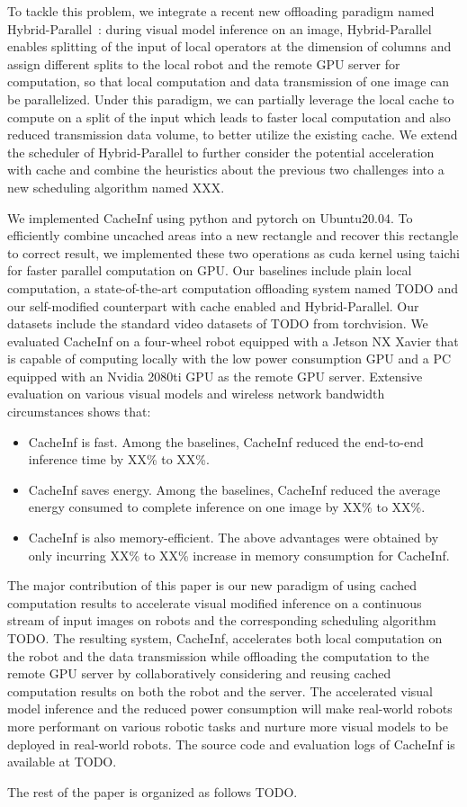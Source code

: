 To tackle this problem, we integrate a recent new offloading paradigm named Hybrid-Parallel~\cite{sun2024hybridparallel}: during visual model inference on an image, Hybrid-Parallel enables splitting of the input of local operators at the dimension of columns and assign different splits to the local robot and the remote GPU server for computation, so that local computation and data transmission of one image can be parallelized.
Under this paradigm, we can partially leverage the local cache to compute on a split of the input which leads to faster local computation and also reduced transmission data volume, to better utilize the existing cache. 
We extend the scheduler of Hybrid-Parallel to further consider the potential acceleration with cache and combine the heuristics about the previous two challenges into a new scheduling algorithm named XXX.

We implemented CacheInf using python and pytorch on Ubuntu20.04. 
To efficiently combine uncached areas into a new rectangle and recover this rectangle to correct result, we implemented these two operations as cuda kernel using taichi for faster parallel computation on GPU.
Our baselines include plain local computation, a state-of-the-art computation offloading system named TODO and our self-modified counterpart with cache enabled and Hybrid-Parallel.
Our datasets include the standard video datasets of TODO from torchvision.
We evaluated CacheInf on a four-wheel robot equipped with a Jetson NX Xavier that is capable of computing locally with the low power consumption GPU and a PC equipped with an Nvidia 2080ti GPU as the remote GPU server.
Extensive evaluation on various visual models and wireless network bandwidth circumstances shows that:
\begin{itemize}
    \item CacheInf is fast. Among the baselines, CacheInf reduced the end-to-end inference time by XX\% to XX\%.
    \item CacheInf saves energy. Among the baselines, CacheInf reduced the average energy consumed to complete inference on one image by XX\% to XX\%.
    \item CacheInf is also memory-efficient. The above advantages were obtained by only incurring XX\% to XX\% increase in memory consumption for CacheInf.
\end{itemize}

The major contribution of this paper is our new paradigm of using cached computation results to accelerate visual modified inference on a continuous stream of input images on robots and the corresponding scheduling algorithm TODO.
The resulting system, CacheInf, accelerates both local computation on the robot and the data transmission while offloading the computation to the remote GPU server by collaboratively considering and reusing cached computation results on both the robot and the server.
The accelerated visual model inference and the reduced power consumption will make real-world robots more performant on various robotic tasks and nurture more visual models to be deployed in real-world robots.
The source code and evaluation logs of CacheInf is available at TODO.

The rest of the paper is organized as follows TODO.

